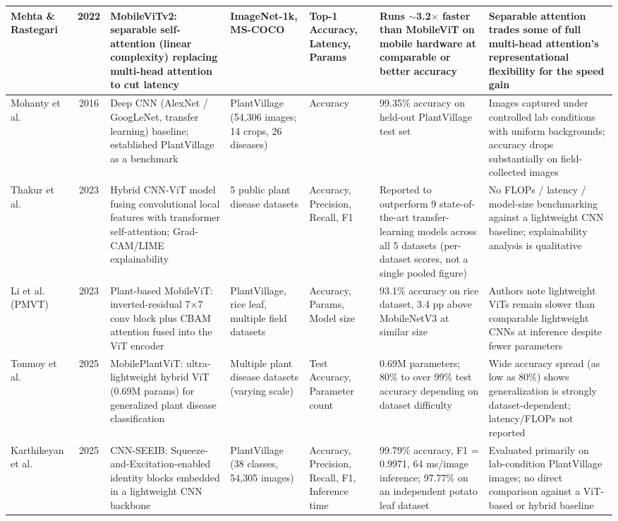 \documentclass[conference]{IEEEtran}
\begin{document}
\begin{table}[!p]
\begin{tabular}{|P{0.087\textwidth}|c|P{0.189\textwidth}|P{0.133\textwidth}|P{0.097\textwidth}|P{0.174\textwidth}|P{0.199\textwidth}|}
\hline
Mehta \& Rastegari~\cite{mehta2022mobilevitv2} & 2022 & MobileViTv2: separable self-attention (linear complexity) replacing multi-head attention to cut latency & ImageNet-1k, MS-COCO & Top-1 Accuracy, Latency, Params & Runs $\sim$3.2$\times$ faster than MobileViT on mobile hardware at comparable or better accuracy & Separable attention trades some of full multi-head attention's representational flexibility for the speed gain \\
\hline
Mohanty et al.~\cite{mohanty2016plant} & 2016 & Deep CNN (AlexNet / GoogLeNet, transfer learning) baseline; established PlantVillage as a benchmark & PlantVillage (54,306 images; 14 crops, 26 diseases) & Accuracy & 99.35\% accuracy on held-out PlantVillage test set & Images captured under controlled lab conditions with uniform backgrounds; accuracy drops substantially on field-collected images \\
\hline
Thakur et al.~\cite{thakur2023vitcnn} & 2023 & Hybrid CNN-ViT model fusing convolutional local features with transformer self-attention; Grad-CAM/LIME explainability & 5 public plant disease datasets & Accuracy, Precision, Recall, F1 & Reported to outperform 9 state-of-the-art transfer-learning models across all 5 datasets (per-dataset scores, not a single pooled figure) & No FLOPs / latency / model-size benchmarking against a lightweight CNN baseline; explainability analysis is qualitative \\
\hline
Li et al. (PMVT)~\cite{li2023pmvt} & 2023 & Plant-based MobileViT: inverted-residual 7$\times$7 conv block plus CBAM attention fused into the ViT encoder & PlantVillage, rice leaf, multiple field datasets & Accuracy, Params, Model size & 93.1\% accuracy on rice dataset, 3.4 pp above MobileNetV3 at similar size & Authors note lightweight ViTs remain slower than comparable lightweight CNNs at inference despite fewer parameters \\
\hline
Tonmoy et al.~\cite{tonmoy2025mobileplantvit} & 2025 & MobilePlantViT: ultra-lightweight hybrid ViT (0.69M params) for generalized plant disease classification & Multiple plant disease datasets (varying scale) & Test Accuracy, Parameter count & 0.69M parameters; 80\% to over 99\% test accuracy depending on dataset difficulty & Wide accuracy spread (as low as 80\%) shows generalization is strongly dataset-dependent; latency/FLOPs not reported \\
\hline
Karthikeyan et al.~\cite{karthikeyan2025cnnseeib} & 2025 & CNN-SEEIB: Squeeze-and-Excitation-enabled identity blocks embedded in a lightweight CNN backbone & PlantVillage (38 classes, 54,305 images) & Accuracy, Precision, Recall, F1, Inference time & 99.79\% accuracy, F1 = 0.9971, 64 ms/image inference; 97.77\% on an independent potato leaf dataset & Evaluated primarily on lab-condition PlantVillage images; no direct comparison against a ViT-based or hybrid baseline \\

\end{tabular}
\end{table}
\end{document}
